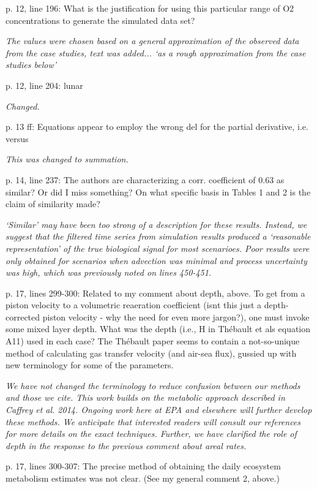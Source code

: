 \documentclass[letterpaper,12pt]{article}\usepackage[]{graphicx}\usepackage[]{color}
\begin{document}
p. 12, line 196: What is the justification for using this particular range of O2 concentrations to generate the simulated data set?

{\it The values were chosen based on a general approximation of the observed data from the case studies, text was added... `as a rough approximation from the case studies below'}

p. 12, line 204: lunar

{\it Changed.}

p. 13 ff: Equations appear to employ the wrong del for the partial derivative, i.e. versus

{\it This was changed to summation.}

p. 14, line 237: The authors are characterizing a corr. coefficient of 0.63 as similar? Or did I
miss something? On what specific basis in Tables 1 and 2 is the claim of similarity made?

{\it `Similar' may have been too strong of a description for these results.  Instead, we suggest that the filtered time series from simulation results produced a `reasonable representation' of the true biological signal for most scenarioes.  Poor results were only obtained for scenarios when advection was minimal and process uncertainty was high, which was previously noted on lines 450-451.}

p. 17, lines 299-300: Related to my comment about depth, above. To get from a piston velocity
to a volumetric reaeration coefficient (isnt this just a depth-corrected piston velocity - why the need for even more jargon?), one must invoke some mixed layer depth. What was the depth (i.e., H in Thébault et als equation A11) used in each case? The Thébault paper seems to contain a not-so-unique method of calculating gas transfer velocity (and air-sea flux), gussied up with new terminology for some of the parameters.

{\it We have not changed the terminology to reduce confusion between our methods and those we cite.  This work builds on the metabolic approach described in Caffrey et al. 2014.  Ongoing work here at EPA and elsewhere will further develop these methods.  We anticipate that interested readers will consult our references for more details on the exact techniques.  Further, we have clarified the role of depth in the response to the previous comment about areal rates.}

p. 17, lines 300-307: The precise method of obtaining the daily ecosystem metabolism estimates was not clear. (See my general comment 2, above.)
\end{document}
